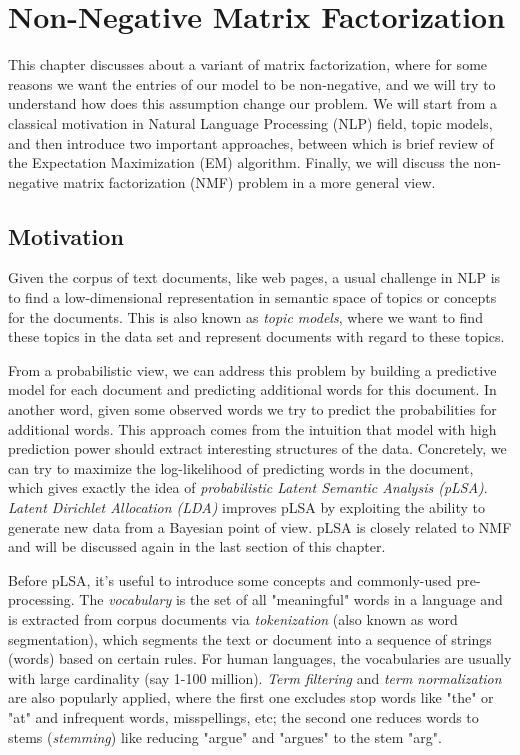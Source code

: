\documentclass[../book-template.tex]{subfiles}
\begin{document}
\chapter{Non-Negative Matrix Factorization}
This chapter discusses about a variant of matrix factorization, where for some reasons we want the entries of our model to be non-negative, and we will try to understand how does this assumption change our problem. We will start from a classical motivation in Natural Language Processing (NLP) field, topic models, and then introduce two important approaches, between which is brief review of the Expectation Maximization (EM) algorithm. Finally, we will discuss the non-negative matrix factorization (NMF) problem in a more general view.
\section{Motivation}
Given the corpus of text documents, like web pages, a usual challenge in NLP is to find a low-dimensional representation in semantic space of topics or concepts for the documents. This is also known as \emph{topic models}, where we want to find these topics in the data set and represent documents with regard to these topics. 
\par From a probabilistic view, we can address this problem by building a predictive model for each document and predicting additional words for this document. In another word, given some observed words we try to predict the probabilities for additional words. This approach comes from the intuition that model with high prediction power should extract interesting structures of the data. Concretely, we can try to maximize the log-likelihood of predicting words in the document, which gives exactly the idea of \emph{probabilistic Latent Semantic Analysis (pLSA)}. \emph{Latent Dirichlet Allocation (LDA)} improves pLSA by exploiting the ability to generate new data from a Bayesian point of view. pLSA is closely related to NMF and will be discussed again in the last section of this chapter.
\par Before pLSA, it's useful to introduce some concepts and commonly-used pre-processing. The \emph{vocabulary} is the set of all "meaningful" words in a language and is extracted from corpus documents via \emph{tokenization} (also known as word segmentation), which segments the text or document into a sequence of strings (words) based on certain rules. For human languages, the vocabularies are usually with large cardinality (say 1-100 million). \emph{Term filtering} and \emph{term normalization} are also popularly applied, where the first one excludes stop words like "the" or "at" and infrequent words, misspellings, etc; the second one reduces words to stems (\emph{stemming}) like reducing "argue" and "argues" to the stem "arg".
\end{document}
